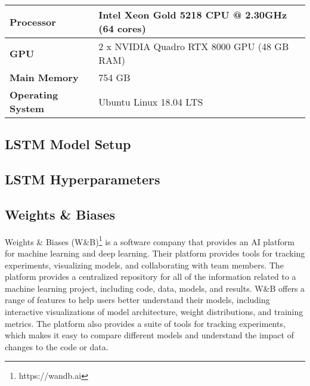     \begin{center}
      \begin{tabular}{| l | l |}
        \hline
        \textbf{Processor}   &   Intel Xeon Gold 5218 CPU @ 2.30GHz (64 cores) \\ \hline
        \textbf{GPU}         &   2 x NVIDIA Quadro RTX 8000 GPU (48 GB RAM)    \\ \hline
        \textbf{Main Memory} &   754 GB                                        \\ \hline
        \textbf{Operating System} &  Ubuntu Linux 18.04 LTS                    \\ \hline

        \hline
      \end{tabular}
      \end{center}




  \subsection{LSTM Model Setup}

  \subsection{LSTM Hyperparameters}
  \label{sec:lstm-hyperparameters-evaluation-setup}


  \subsection{Weights \& Biases}
  \label{sec:wandb-evaluation-setup}
    
    Weights \& Biases (W\&B)\footnote{https://wandb.ai} is a software company that provides an AI platform for machine learning and deep learning. Their platform provides tools for tracking experiments, visualizing models, and collaborating with team members.
    The platform provides a centralized repository for all of the information related to a machine learning project, including code, data, models, and results.
    W\&B offers a range of features to help users better understand their models, including interactive visualizations of model architecture, weight distributions, and training metrics. The platform also provides a suite of tools for tracking experiments, which makes it easy to compare different models and understand the impact of changes to the code or data.



